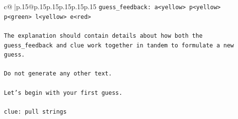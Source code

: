 \documentclass{article}
\begin{document}
{\begin{supertabular}{c@{$\;$}|p{.15\linewidth}@{}p{.15\linewidth}p{.15\linewidth}p{.15\linewidth}p{.15\linewidth}p{.15\linewidth}}
{{{\texttt{guess\_feedback: a<yellow> p<yellow> p<green> l<yellow> e<red>} \\
\\ 
\texttt{The explanation should contain details about how both the guess\_feedback and clue work together in tandem to formulate a new guess.} \\
\\ 
\texttt{Do not generate any other text.} \\
\\ 
\texttt{Let's begin with your first guess.} \\
\\ 
\texttt{clue: pull strings} \\
            }
        }
    }
     \\ \\


\end{supertabular}}
\end{document}
